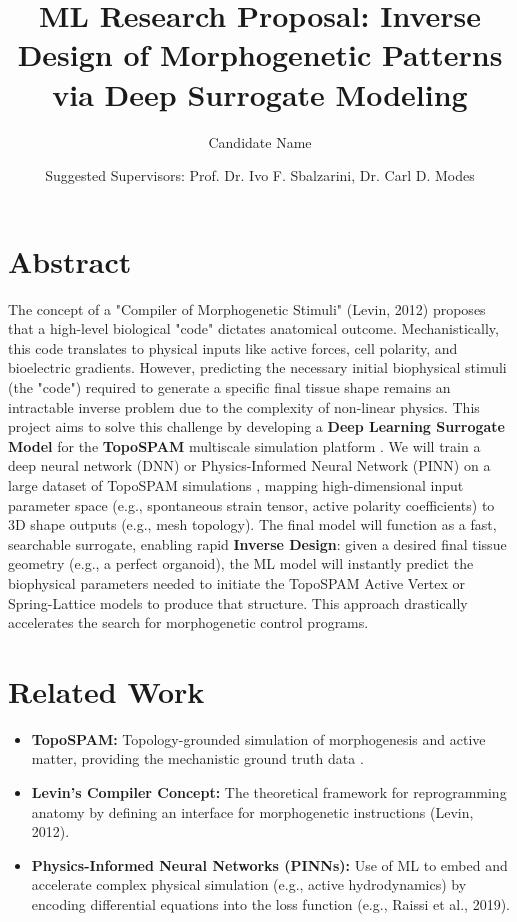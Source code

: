\documentclass{article}
\title{ML Research Proposal: Inverse Design of Morphogenetic Patterns via Deep Surrogate Modeling}
\author{Candidate Name}
\date{Suggested Supervisors: Prof. Dr. Ivo F. Sbalzarini, Dr. Carl D. Modes}
\begin{document}
\maketitle

\section*{Abstract}
The concept of a "Compiler of Morphogenetic Stimuli" (Levin, 2012) proposes that a high-level biological "code" dictates anatomical outcome. Mechanistically, this code translates to physical inputs like active forces, cell polarity, and bioelectric gradients. However, predicting the necessary initial biophysical stimuli (the "code") required to generate a specific final tissue shape remains an intractable inverse problem due to the complexity of non-linear physics. This project aims to solve this challenge by developing a \textbf{Deep Learning Surrogate Model} for the \textbf{TopoSPAM} multiscale simulation platform \cite{1}. We will train a deep neural network (DNN) or Physics-Informed Neural Network (PINN) on a large dataset of TopoSPAM simulations \cite{1}, mapping high-dimensional input parameter space (e.g., spontaneous strain tensor, active polarity coefficients) to 3D shape outputs (e.g., mesh topology). The final model will function as a fast, searchable surrogate, enabling rapid \textbf{Inverse Design}: given a desired final tissue geometry (e.g., a perfect organoid), the ML model will instantly predict the biophysical parameters needed to initiate the TopoSPAM Active Vertex or Spring-Lattice models to produce that structure. This approach drastically accelerates the search for morphogenetic control programs.

\section*{Related Work}
\begin{itemize}
    \item \textbf{TopoSPAM:} Topology-grounded simulation of morphogenesis and active matter, providing the mechanistic ground truth data \cite{1}.
    \item \textbf{Levin's Compiler Concept:} The theoretical framework for reprogramming anatomy by defining an interface for morphogenetic instructions (Levin, 2012).
    \item \textbf{Physics-Informed Neural Networks (PINNs):} Use of ML to embed and accelerate complex physical simulation (e.g., active hydrodynamics) by encoding differential equations into the loss function (e.g., Raissi et al., 2019).
\end{itemize}
\end{document}
